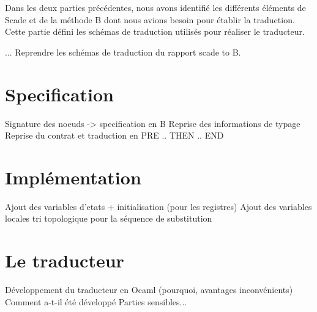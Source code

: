 


Dans les deux parties précédentes, nous avons identifié les différents
éléments de Scade et de la méthode B dont nous avions besoin pour
établir la traduction. Cette partie défini les schémas de traduction
utilisés pour réaliser le traducteur.


...
Reprendre les schémas de traduction du rapport scade to B.

\section{Specification}
Signature des noeuds -> specification en B
Reprise des informations de typage
Reprise du contrat et traduction en PRE .. THEN .. END


\section{Implémentation}
Ajout des variables d'etats + initialisation (pour les registres)
Ajout des variables locales
tri topologique pour la séquence de substitution

\section{Le traducteur}
Développement du traducteur en Ocaml (pourquoi, avantages
inconvénients)
Comment a-t-il été développé
Parties sensibles...
